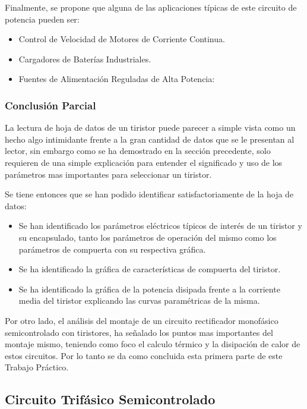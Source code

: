 \documentclass[12pt,a4paper]{article}
\begin{document}
Finalmente, se propone que alguna de las aplicaciones típicas de este circuito de potencia pueden ser:
\begin{itemize}
    \item Control de Velocidad de Motores de Corriente Continua.
    \item Cargadores de Baterías Industriales.
    \item Fuentes de Alimentación Reguladas de Alta Potencia:
\end{itemize}



\subsubsection{Conclusión Parcial}
La lectura de hoja de datos de un tiristor puede parecer a simple vista como un hecho algo intimidante frente a la gran cantidad de datos que se le presentan al lector, sin embargo como se ha demostrado en la sección precedente, solo requieren de una simple explicación para entender el significado y uso de los parámetros mas importantes para seleccionar un tiristor.

Se tiene entonces que se han podido identificar satisfactoriamente de la hoja de datos:
\begin{itemize}
    \item Se han identificado los parámetros eléctricos típicos de interés de un tiristor y su encapsulado, tanto los parámetros de operación del mismo como los parámetros de compuerta con su respectiva gráfica.
    \item Se ha identificado la gráfica de características de compuerta del tiristor.
    \item Se ha identificado la gráfica de la potencia disipada frente a la corriente media del tiristor explicando las curvas paramétricas de la misma.
\end{itemize}

Por otro lado, el análisis del montaje de un circuito rectificador monofásico semicontrolado con tiristores, ha señalado los puntos mas importantes del montaje mismo, teniendo como foco el calculo térmico y la disipación de calor de estos circuitos. Por lo tanto se da como concluida esta primera parte de este Trabajo Práctico.



\subsection{Circuito Trifásico Semicontrolado}
\end{document}
